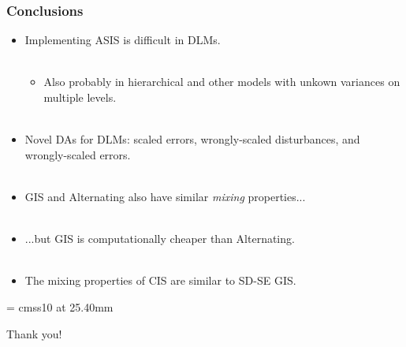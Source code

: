 \documentclass[xcolor=dvipsnames]{beamer}
\begin{document}
\begin{frame}
\frametitle{Conclusions}
\begin{itemize}
\item Implementing ASIS is difficult in DLMs.\\~\\
\begin{itemize}
\item[]Also probably in hierarchical and other models with unkown variances on multiple levels.\\~\\
\end{itemize}

\item Novel DAs for DLMs: scaled errors, wrongly-scaled disturbances, and wrongly-scaled errors.\\~\\

\item GIS and Alternating also have similar {\it mixing} properties...\\~\\

\item ...but GIS is computationally cheaper than Alternating.\\~\\

\item The mixing properties of CIS are similar to SD-SE GIS.

\end{itemize}
\end{frame}

\appendix
{}
\setcounter{finalframe}{\value{framenumber}}

\begin{frame}

      \begin{center}

        \font\endfont = cmss10 at 25.40mm
        \color{Red}
        \endfont 
        \baselineskip 20.0mm

        Thank you!

      \end{center}    


\end{frame}
\end{document}
